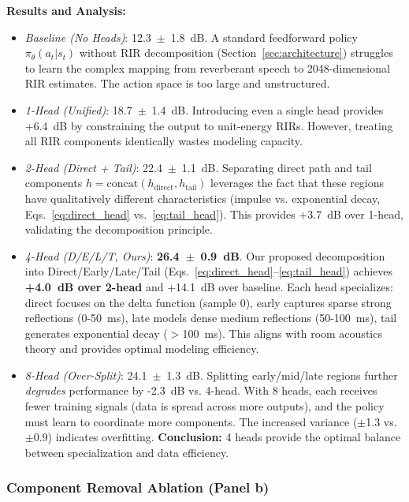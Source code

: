 \documentclass[12pt,a4paper]{article}
\begin{document}
\textbf{Results and Analysis:}
\begin{itemize}
\item \textit{Baseline (No Heads)}: 12.3~$\pm$~1.8~dB. A standard feedforward policy $\pi_\theta(a_t | s_t)$ without RIR decomposition (Section~\ref{sec:architecture}) struggles to learn the complex mapping from reverberant speech to 2048-dimensional RIR estimates. The action space is too large and unstructured.

\item \textit{1-Head (Unified)}: 18.7~$\pm$~1.4~dB. Introducing even a single head provides +6.4~dB by constraining the output to unit-energy RIRs. However, treating all RIR components identically wastes modeling capacity.

\item \textit{2-Head (Direct + Tail)}: 22.4~$\pm$~1.1~dB. Separating direct path and tail components $h = \text{concat}(h_\text{direct}, h_\text{tail})$ leverages the fact that these regions have qualitatively different characteristics (impulse vs. exponential decay, Eqs.~\eqref{eq:direct_head} vs.~\eqref{eq:tail_head}). This provides +3.7~dB over 1-head, validating the decomposition principle.

\item \textit{4-Head (D/E/L/T, Ours)}: \textbf{26.4~$\pm$~0.9~dB}. Our proposed decomposition into Direct/Early/Late/Tail (Eqs.~\eqref{eq:direct_head}--\eqref{eq:tail_head}) achieves \textbf{+4.0~dB over 2-head} and +14.1~dB over baseline. Each head specializes: direct focuses on the delta function (sample 0), early captures sparse strong reflections (0-50~ms), late models dense medium reflections (50-100~ms), tail generates exponential decay ($>$100~ms). This aligns with room acoustics theory and provides optimal modeling efficiency.

\item \textit{8-Head (Over-Split)}: 24.1~$\pm$~1.3~dB. Splitting early/mid/late regions further \textit{degrades} performance by -2.3~dB vs. 4-head. With 8 heads, each receives fewer training signals (data is spread across more outputs), and the policy must learn to coordinate more components. The increased variance ($\pm$1.3 vs. $\pm$0.9) indicates overfitting. \textbf{Conclusion:} 4 heads provide the optimal balance between specialization and data efficiency.
\end{itemize}

\subsubsection{Component Removal Ablation (Panel b)}
\end{document}
